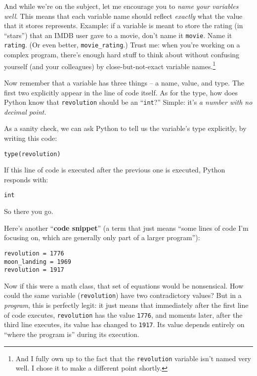 And while we're on the subject, let me encourage you to \textit{name your
variables well}. This means that each variable name should reflect
\textit{exactly} what the value that it stores represents. Example: if a
variable is meant to store the rating (in ``stars'') that an IMDB user gave to
a movie, don't name it \texttt{movie}. Name it \texttt{rating}. (Or even
better, \texttt{movie\_rating}.) Trust me: when you're working on a complex
program, there's enough hard stuff to think about without confusing yourself
(and your colleagues) by close-but-not-exact variable names.\footnote{And I
fully own up to the fact that the \texttt{revolution} variable isn't named very
well. I chose it to make a different point shortly.}

Now remember that a variable has three things -- a name, value, and type. The
first two explicitly appear in the line of code itself. As for the type, how
does Python know that \texttt{revolution} should be an ``\texttt{int}?''
Simple: it's \textit{a number with no decimal point.}

As a sanity check, we can ask Python to tell us the variable's type explicitly,
by writing this code:

\label{typeFunction}
\begin{Verbatim}[fontsize=\small,samepage=true,frame=single,framesep=3mm]
type(revolution)
\end{Verbatim}

If this line of code is executed after the previous one is executed, Python
responds with:

\begin{Verbatim}[fontsize=\small,samepage=true,frame=leftline,framesep=5mm,framerule=1mm]
int
\end{Verbatim}

So there you go.

Here's another ``\textbf{code snippet}'' (a term that just means ``some lines
of code I'm focusing on, which are generally only part of a larger program''):

\begin{Verbatim}[fontsize=\small,samepage=true,frame=single,framesep=3mm]
revolution = 1776
moon_landing = 1969
revolution = 1917
\end{Verbatim}

Now if this were a math class, that set of equations would be nonsensical. How
could the same variable (\texttt{revolution}) have two contradictory values?
But in a \textit{program}, this is perfectly legit: it just means that
immediately after the first line of code executes, \texttt{revolution} has the
value \texttt{1776}, and moments later, after the third line executes, its
value has changed to \texttt{1917}. Its value depends entirely on ``where the
program is'' during its execution.

